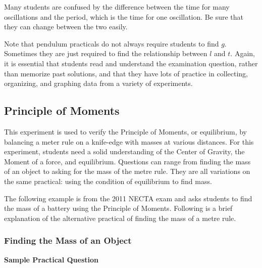 Many students are confused by the difference between the time for many oscillations and
the period, which is the time for one oscillation. Be sure that they can change between
the two easily.

Note that pendulum practicals do not always require students to find $g$. Sometimes they are just required to find the relationship between $l$ and $t$. Again, it is essential that students read and understand the examination question, rather than memorize past solutions, and that they have lots of practice in collecting, organizing, and graphing data from a variety of experiments.

\subsection{Principle of Moments}  

This experiment is used to verify the Principle of Moments, or equilibrium, by
balancing a meter rule on a knife-edge with masses at various distances. For this experiment, students need
a solid understanding of the Center of Gravity, the Moment of a force, and equilibrium.
Questions can range from finding the mass of an object to asking for
the mass of the metre rule. They are all
variations on the same practical: using the condition of equilibrium to find mass.

The following example is from the 2011 NECTA exam and asks students to find the mass of a battery using the Principle of Moments. Following is a brief explanation of the alternative practical of finding the mass of a metre rule.

\subsubsection{Finding the Mass of an Object}

\noindent \textbf{Sample Practical Question}\\

